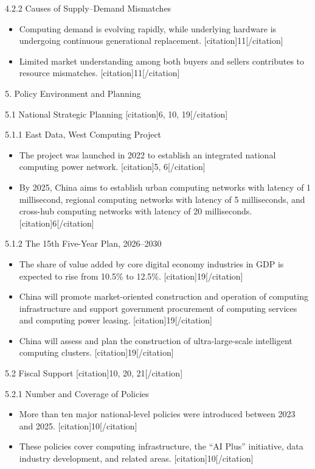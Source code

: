 \documentclass{huawei}
\begin{document}
\begin{tcolorbox}[
    title={Example of Hierarchical Research Outline},
    colback=gray!5,
    colframe=gray!40,
    fonttitle=\bfseries,
    boxrule=0.5pt,
    arc=2pt,
    breakable
]
\textcolor{TitleRed}{4.2.2 Causes of Supply–Demand Mismatches}
\begin{itemize}[leftmargin=1em, listparindent=\parindent]
\item Computing demand is evolving rapidly, while underlying hardware is undergoing continuous generational replacement. [citation]11[/citation]
\item Limited market understanding among both buyers and sellers contributes to resource mismatches. [citation]11[/citation]
\end{itemize}

\textcolor{TitleRed}{5. Policy Environment and Planning}

\textcolor{TitleRed}{5.1 National Strategic Planning [citation]6, 10, 19[/citation]}

\textcolor{TitleRed}{5.1.1 East Data, West Computing Project}
\begin{itemize}[leftmargin=1em, listparindent=\parindent]
\item The project was launched in 2022 to establish an integrated national computing power network. [citation]5, 6[/citation]
\item By 2025, China aims to establish urban computing networks with latency of 1 millisecond, regional computing networks with latency of 5 milliseconds, and cross-hub computing networks with latency of 20 milliseconds. [citation]6[/citation]
\end{itemize}

\textcolor{TitleRed}{5.1.2 The 15th Five-Year Plan, 2026–2030}
\begin{itemize}[leftmargin=1em, listparindent=\parindent]
\item The share of value added by core digital economy industries in GDP is expected to rise from 10.5\% to 12.5\%. [citation]19[/citation]
\item China will promote market-oriented construction and operation of computing infrastructure and support government procurement of computing services and computing power leasing. [citation]19[/citation]
\item China will assess and plan the construction of ultra-large-scale intelligent computing clusters. [citation]19[/citation]
\end{itemize}

\textcolor{TitleRed}{5.2 Fiscal Support [citation]10, 20, 21[/citation]}

\textcolor{TitleRed}{5.2.1 Number and Coverage of Policies}
\begin{itemize}[leftmargin=1em, listparindent=\parindent]
\item More than ten major national-level policies were introduced between 2023 and 2025. [citation]10[/citation]
\item These policies cover computing infrastructure, the “AI Plus” initiative, data industry development, and related areas. [citation]10[/citation]
\end{itemize}


\end{tcolorbox}
\end{document}
